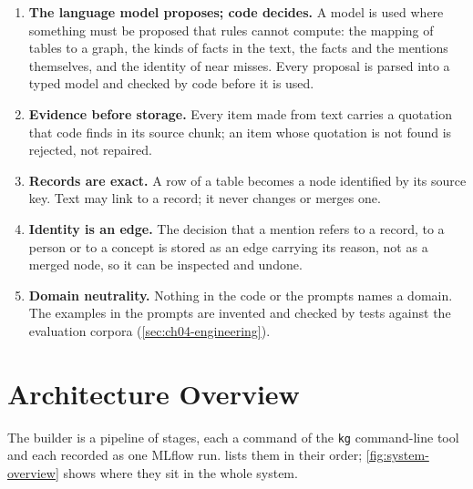 \begin{enumerate}[nosep]
\item \textbf{The language model proposes; code decides.} A model is used where something must be proposed
that rules cannot compute: the mapping of tables to a graph, the kinds of facts in the text, the facts and the
mentions themselves, and the identity of near misses. Every proposal is parsed into a typed model and checked by
code before it is used.
\item \textbf{Evidence before storage.} Every item made from text carries a quotation that code finds in its
source chunk; an item whose quotation is not found is rejected, not repaired.
\item \textbf{Records are exact.} A row of a table becomes a node identified by its source key. Text may link
to a record; it never changes or merges one.
\item \textbf{Identity is an edge.} The decision that a mention refers to a record, to a person or to a concept
is stored as an edge carrying its reason, not as a merged node, so it can be inspected and undone.
\item \textbf{Domain neutrality.} Nothing in the code or the prompts names a domain. The examples in the
prompts are invented and checked by tests against the evaluation corpora (\cref{sec:ch04-engineering}).
\end{enumerate}

\section{Architecture Overview}\label{sec:ch04-architecture}

The builder is a pipeline of stages, each a command of the \texttt{kg} command-line tool and each recorded as
one MLflow run.  lists them in their order; \cref{fig:system-overview} shows where
they sit in the whole system.

